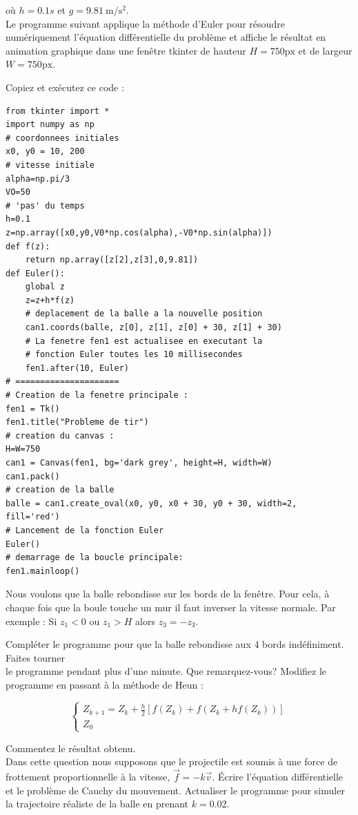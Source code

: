 \documentclass[10pt]{article}
\begin{document}
où \(h=0.1 s\) et \(g=9.81 \mathrm{~m} / \mathrm{s}^{2}\).\\
Le programme suivant applique la méthode d'Euler pour résoudre numériquement l'équation différentielle du problème et affiche le résultat en animation graphique dans une fenêtre tkinter de hauteur \(H=750 \mathrm{px}\) et de largeur \(W=750 \mathrm{px}\).

Copiez et exécutez ce code :

\begin{verbatim}
from tkinter import *
import numpy as np
# coordonnees initiales
x0, y0 = 10, 200
# vitesse initiale
alpha=np.pi/3
VO=50
# 'pas' du temps
h=0.1
z=np.array([x0,y0,V0*np.cos(alpha),-V0*np.sin(alpha)])
def f(z):
    return np.array([z[2],z[3],0,9.81])
def Euler():
    global z
    z=z+h*f(z)
    # deplacement de la balle a la nouvelle position
    can1.coords(balle, z[0], z[1], z[0] + 30, z[1] + 30)
    # La fenetre fen1 est actualisee en executant la
    # fonction Euler toutes les 10 millisecondes
    fen1.after(10, Euler)
# =====================
# Creation de la fenetre principale :
fen1 = Tk()
fen1.title("Probleme de tir")
# creation du canvas :
H=W=750
can1 = Canvas(fen1, bg='dark grey', height=H, width=W)
can1.pack()
# creation de la balle
balle = can1.create_oval(x0, y0, x0 + 30, y0 + 30, width=2, fill='red')
# Lancement de la fonction Euler
Euler()
# demarrage de la boucle principale:
fen1.mainloop()
\end{verbatim}

Nous voulons que la balle rebondisse sur les bords de la fenêtre. Pour cela, à chaque fois que la boule touche un mur il faut inverser la vitesse normale. Par exemple : Si \(z_{1}<0\) ou \(z_{1}>H\) alors \(z_{3}=-z_{3}\).

Compléter le programme pour que la balle rebondisse aux 4 bords indéfiniment. Faites tourner\\
le programme pendant plus d'une minute. Que remarquez-vous? Modifiez le programme en passant à la méthode de Heun :

\[
\left\{\begin{array}{l}
Z_{k+1}=Z_{k}+\frac{h}{2}\left[f\left(Z_{k}\right)+f\left(Z_{k}+h f\left(Z_{k}\right)\right)\right] \\
Z_{0}
\end{array}\right.
\]

Commentez le résultat obtenu.\\
Dans cette question nous supposons que le projectile est soumis à une force de frottement proportionnelle à la vitesse, \(\vec{f}=-k \vec{v}\). Écrire l'équation différentielle et le problème de Cauchy du mouvement. Actualiser le programme pour simuler la trajectoire réaliste de la balle en prenant \(k=0.02\).
\end{document}
